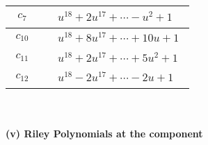 \documentclass[1p]{elsarticle_modified}
\theoremstyle{definition}
\begin{document}
\begin{tabular}{m{50pt}|m{274pt}}
\hline $$\begin{aligned}c_{7}\end{aligned}$$&$\begin{aligned}
&u^{18}+2 u^{17}+\cdots- u^2+1
\end{aligned}$\\
\hline $$\begin{aligned}c_{10}\end{aligned}$$&$\begin{aligned}
&u^{18}+8 u^{17}+\cdots+10 u+1
\end{aligned}$\\
\hline $$\begin{aligned}c_{11}\end{aligned}$$&$\begin{aligned}
&u^{18}+2 u^{17}+\cdots+5 u^2+1
\end{aligned}$\\
\hline $$\begin{aligned}c_{12}\end{aligned}$$&$\begin{aligned}
&u^{18}-2 u^{17}+\cdots-2 u+1
\end{aligned}$\\
\hline
\end{tabular}\\~\\
\newpage\renewcommand{\arraystretch}{1}
\flushleft \textbf{(v) Riley Polynomials at the component}\newline \\
\end{document}
